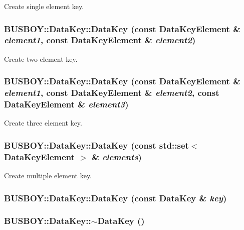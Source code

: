 Create single element key. \hypertarget{classBUSBOY_1_1DataKey_a727da01dad9831cbc8b8c4a7b9c2c7ed}{
\subsubsection[{DataKey}]{\setlength{\rightskip}{0pt plus 5cm}BUSBOY::DataKey::DataKey (const {\bf DataKeyElement} \& {\em element1}, \/  const {\bf DataKeyElement} \& {\em element2})}}
\label{classBUSBOY_1_1DataKey_a727da01dad9831cbc8b8c4a7b9c2c7ed}


Create two element key. \hypertarget{classBUSBOY_1_1DataKey_a66ee54044cf3f0e1a2b65a9f1a97da8e}{
\subsubsection[{DataKey}]{\setlength{\rightskip}{0pt plus 5cm}BUSBOY::DataKey::DataKey (const {\bf DataKeyElement} \& {\em element1}, \/  const {\bf DataKeyElement} \& {\em element2}, \/  const {\bf DataKeyElement} \& {\em element3})}}
\label{classBUSBOY_1_1DataKey_a66ee54044cf3f0e1a2b65a9f1a97da8e}


Create three element key. \hypertarget{classBUSBOY_1_1DataKey_a7400abad73819b03383e319bf5a8d792}{
\subsubsection[{DataKey}]{\setlength{\rightskip}{0pt plus 5cm}BUSBOY::DataKey::DataKey (const std::set$<$ {\bf DataKeyElement} $>$ \& {\em elements})}}
\label{classBUSBOY_1_1DataKey_a7400abad73819b03383e319bf5a8d792}


Create multiple element key. \hypertarget{classBUSBOY_1_1DataKey_a1a3fa06e41b8139e9f2e4e4a42710e36}{
\subsubsection[{DataKey}]{\setlength{\rightskip}{0pt plus 5cm}BUSBOY::DataKey::DataKey (const {\bf DataKey} \& {\em key})}}
\label{classBUSBOY_1_1DataKey_a1a3fa06e41b8139e9f2e4e4a42710e36}
\hypertarget{classBUSBOY_1_1DataKey_a0406cc6a3f60b7d056e5315c84cebbd7}{
\subsubsection[{$\sim$DataKey}]{\setlength{\rightskip}{0pt plus 5cm}BUSBOY::DataKey::$\sim$DataKey ()}}
\label{classBUSBOY_1_1DataKey_a0406cc6a3f60b7d056e5315c84cebbd7}


